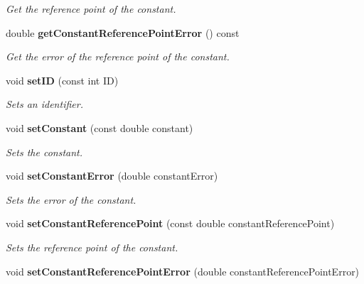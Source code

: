\begin{DoxyCompactItemize}
\begin{DoxyCompactList}\small\item\em Get the reference point of the constant. \end{DoxyCompactList}\item 
double {\bf get\-Constant\-Reference\-Point\-Error} () const \label{classCALICE_1_1LinearFitConstant_a7c977c3a9db317ed19f895e047fc02a2}

\begin{DoxyCompactList}\small\item\em Get the error of the reference point of the constant. \end{DoxyCompactList}\item 
void {\bf set\-I\-D} (const int I\-D)\label{classCALICE_1_1LinearFitConstant_a2c386d168d63ee9cf76f2381401daaa0}

\begin{DoxyCompactList}\small\item\em Sets an identifier. \end{DoxyCompactList}\item 
void {\bf set\-Constant} (const double constant)\label{classCALICE_1_1LinearFitConstant_a3b016378df601216e55545308334e1d8}

\begin{DoxyCompactList}\small\item\em Sets the constant. \end{DoxyCompactList}\item 
void {\bf set\-Constant\-Error} (double constant\-Error)\label{classCALICE_1_1LinearFitConstant_aa096484667f26f82589cc0745310564d}

\begin{DoxyCompactList}\small\item\em Sets the error of the constant. \end{DoxyCompactList}\item 
void {\bf set\-Constant\-Reference\-Point} (const double constant\-Reference\-Point)\label{classCALICE_1_1LinearFitConstant_aad5420fa51f86f5fc8a038b97794289b}

\begin{DoxyCompactList}\small\item\em Sets the reference point of the constant. \end{DoxyCompactList}\item 
void {\bf set\-Constant\-Reference\-Point\-Error} (double constant\-Reference\-Point\-Error)\label{classCALICE_1_1LinearFitConstant_a7ed2758698bd0da83348812817c4395a}


\end{DoxyCompactItemize}
